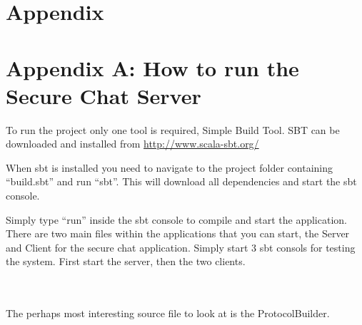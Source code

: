 \section{Appendix}
\section*{Appendix A: How to run the Secure Chat Server}
To run the project only one tool is required, Simple Build Tool. SBT can be downloaded and installed from \href{http://www.scala-sbt.org/}{http://www.scala-sbt.org/}

When sbt is installed you need to navigate to the project folder containing ``build.sbt'' and run ``sbt''. This will download all dependencies and start the sbt console. 

Simply type ``run'' inside the sbt console to compile and start the application. There are two main files within the applications that you can start, the Server and Client for the secure chat application. Simply start 3 sbt consols for testing the system. First start the server, then the two clients.

\\\\
The perhaps most interesting source file to look at is the ProtocolBuilder.


